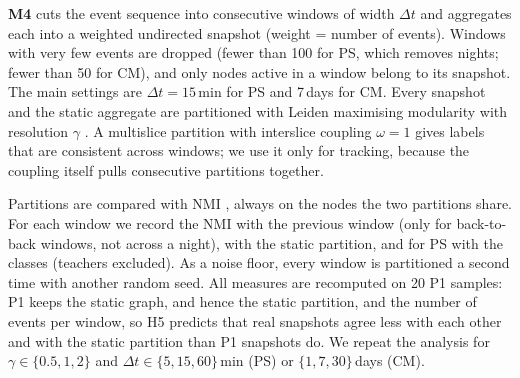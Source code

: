 \textbf{M4} cuts the event sequence into consecutive windows of width $\Delta t$ and
aggregates each into a weighted undirected snapshot (weight = number of events). Windows
with very few events are dropped (fewer than 100 for PS, which removes nights; fewer
than 50 for CM), and only nodes active in a window belong to its snapshot. The main
settings are $\Delta t=15$\,min for PS and 7\,days for CM. Every snapshot and the
static aggregate are partitioned with Leiden \citep{traag2019louvain} maximising
modularity with resolution $\gamma$ \citep{reichardt2006statistical}. A multislice
partition \citep{mucha2010community} with interslice coupling $\omega=1$ gives labels
that are consistent across windows; we use it only for tracking, because the coupling
itself pulls consecutive partitions together.

Partitions are compared with NMI \citep{danon2005comparing}, always on the nodes the two
partitions share. For each window we record the NMI with the previous window (only for
back-to-back windows, not across a night), with the static partition, and for PS with
the classes (teachers excluded). As a noise floor, every window is partitioned a second
time with another random seed. All measures are recomputed on 20 P1 samples: P1 keeps
the static graph, and hence the static partition, and the number of events per window,
so H5 predicts that real snapshots agree less with each other and with the static
partition than P1 snapshots do. We repeat the analysis for $\gamma\in\{0.5,1,2\}$ and
$\Delta t\in\{5,15,60\}$\,min (PS) or $\{1,7,30\}$\,days (CM).
